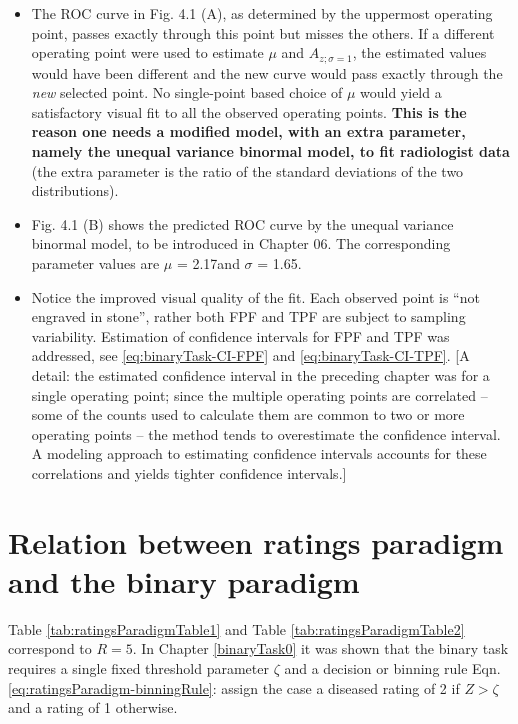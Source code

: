 \documentclass[
]{book}
\begin{document}
\begin{itemize}
\item
  The ROC curve in Fig. 4.1 (A), as determined by the uppermost operating point, passes exactly through this point but misses the others. If a different operating point were used to estimate \(\mu\) and \(A_{z;\sigma = 1}\), the estimated values would have been different and the new curve would pass exactly through the \emph{new} selected point. No single-point based choice of \(\mu\) would yield a satisfactory visual fit to all the observed operating points. \textbf{This is the reason one needs a modified model, with an extra parameter, namely the unequal variance binormal model, to fit radiologist data} (the extra parameter is the ratio of the standard deviations of the two distributions).
\item
  Fig. 4.1 (B) shows the predicted ROC curve by the unequal variance binormal model, to be introduced in Chapter 06. The corresponding parameter values are \(\mu\) = 2.17and \(\sigma\) = 1.65.
\item
  Notice the improved visual quality of the fit. Each observed point is ``not engraved in stone'', rather both FPF and TPF are subject to sampling variability. Estimation of confidence intervals for FPF and TPF was addressed, see \eqref{eq:binaryTask-CI-FPF} and \eqref{eq:binaryTask-CI-TPF}. {[}A detail: the estimated confidence interval in the preceding chapter was for a single operating point; since the multiple operating points are correlated -- some of the counts used to calculate them are common to two or more operating points -- the method tends to overestimate the confidence interval. A modeling approach to estimating confidence intervals accounts for these correlations and yields tighter confidence intervals.{]}
\end{itemize}

\hypertarget{relation-between-ratings-paradigm-and-the-binary-paradigm}{%
\section{Relation between ratings paradigm and the binary paradigm}\label{relation-between-ratings-paradigm-and-the-binary-paradigm}}

Table \ref{tab:ratingsParadigmTable1} and Table \ref{tab:ratingsParadigmTable2} correspond to \(R = 5\). In Chapter \ref{binaryTask0} it was shown that the binary task requires a single fixed threshold parameter \(\zeta\) and a decision or binning rule Eqn. \eqref{eq:ratingsParadigm-binningRule}: assign the case a diseased rating of 2 if \(Z > \zeta\) and a rating of 1 otherwise.
\end{document}
